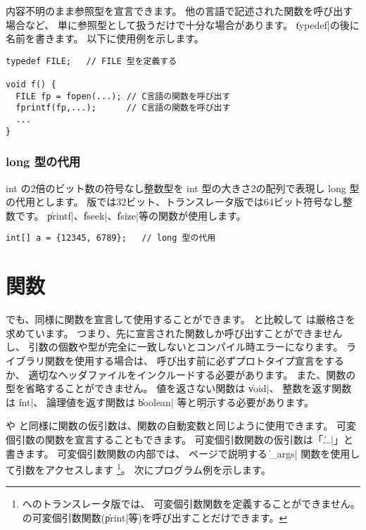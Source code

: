 内容不明のまま参照型を宣言できます。
他の言語で記述された関数を呼び出す場合など、
単に参照型として扱うだけで十分な場合があります。
\|typedef|の後に名前を書きます。
以下に使用例を示します。

\begin{mylist}
\begin{verbatim}
typedef FILE;   // FILE 型を定義する

void f() {
  FILE fp = fopen(...); // C言語の関数を呼び出す
  fprintf(fp,...);      // C言語の関数を呼び出す
  ...
}
\end{verbatim}
\end{mylist}

\subsubsection{long 型の代用}

int の2倍のビット数の符号なし整数型を
int 型の大きさ2の配列で表現し long 型の代用とします。
{\tac}版では32ビット、トランスレータ版では64ビット符号なし整数です。
\|printf|、\|fseek|、\|fsize|等の関数が使用します。

\begin{mylist}
\begin{verbatim}
int[] a = {12345, 6789};   // long 型の代用
\end{verbatim}
\end{mylist}



\section{関数}
\label{chap3:func}
\cmml でも、\cl 同様に関数を宣言して使用することができます。
\cl と比較して \cmml は厳格さを求めています。
つまり、先に宣言された関数しか呼び出すことができませんし、
引数の個数や型が完全に一致しないとコンパイル時エラーになります。
ライブラリ関数を使用する場合は、
呼び出す前に必ずプロトタイプ宣言をするか、
適切なヘッダファイルをインクルードする必要があります。
また、関数の型を省略することができません。
値を返さない関数は \|void|、
整数を返す関数は \|int|、
論理値を返す関数は \|boolean| 等と明示する必要があります。

\cl や \javal と同様に関数の仮引数は、関数の自動変数と同じように使用できます。
可変個引数の関数を宣言することもできます。
可変個引数関数の仮引数は「\|...|」と書きます。
可変個引数関数の内部では、
\pageref{chap4:args}ページで説明する
\|_args| 関数を使用して引数をアクセスします
\footnote{\cl へのトランスレータ版では、
可変個引数関数を定義することができません。
\cl の可変個引数関数(\|print|等)を呼び出すことだけできます。}。
次にプログラム例を示します。

